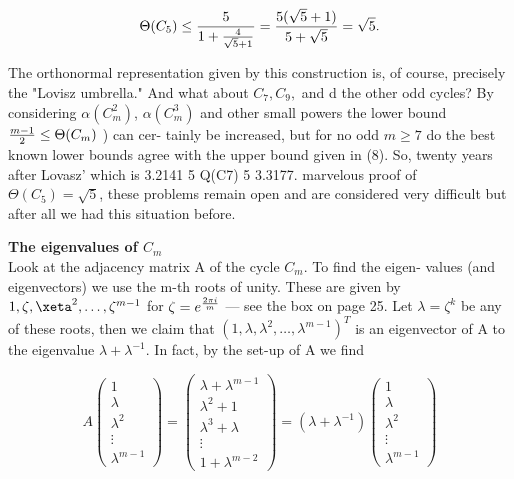 \documentclass[12pt]{memoir}
\begin{document}
\[
\Theta(C_5) \leq {5 \over {1 + {4 \over {\sqrt{5}+1}}}}={{5(\sqrt{5}+1)} \over {5+\sqrt{5}}} = \sqrt{5}.
\]

The orthonormal representation given by this construction is, of course, 
precisely the "Lovisz umbrella." 
And what about $C_7, C_9,$ and d the other odd cycles? By considering $\alpha(C_m^2)$,
$\alpha(C_m^3)$ and other small powers the lower bound ${{m-1} \over 2} \leq \Theta(C_m)$ ) can cer-
tainly be increased, but for no odd $m \geq 7$  do the best known lower bounds
agree with the upper bound given in (8). So, twenty years after Lovasz' which is 3.2141 5 Q(C7) 5 3.3177. 
marvelous proof of $\Theta(C_5) = \sqrt{5}$, these problems remain open and are 
considered very difficult \text{---} but after all we had this situation before.

\begin{mdframed}[nobreak=true]
\vspace{8pt}
{\Large\textbf{The eigenvalues of $C_m$}}\\
[5pt]

Look at the adjacency matrix A of the cycle $C_m$. To find the eigen-
values (and eigenvectors) we use the m-th roots of unity. These are 
given by $1, \zeta, \xeta^2, \ldots, \zeta^{m-1}$ for $\zeta = e^{{2\pi i} \over m}$ --- see the box on page 25. 
Let $\lambda = \zeta ^k$  be any of these roots, then we claim that
$(1, \lambda, \lambda^2, \ldots, \lambda^{m-1})^T$  is an eigenvector of A to the eigenvalue $\lambda + \lambda^{-1}$.
In fact, by the set-up of A we find

\begin{equation*}

A \begin{pmatrix} 1 \\ \lambda \\ \lambda^2 \\ \vdots \\ \lambda^{m-1} \end{pmatrix}=
\begin{pmatrix} \lambda + \lambda^{m-1} \\ \lambda^2 + 1 \\ \lambda^3 + \lambda \\ \vdots \\ 1+\lambda^{m-2} \end{pmatrix} =
(\lambda + \lambda^{-1}) \begin{pmatrix} 1 \\ \lambda \\ \lambda^2 \\ \vdots \\ \lambda^{m-1} \end{pmatrix} 


\end{equation*}
\end{mdframed}
\end{document}
